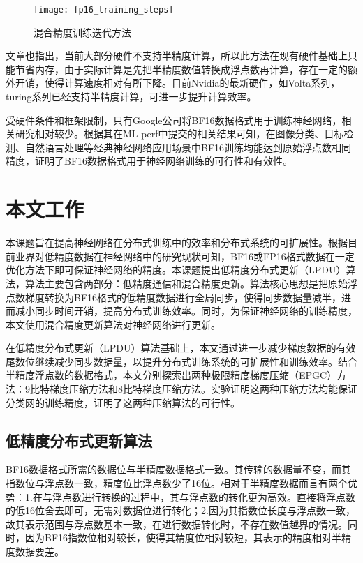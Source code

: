 \begin{figure}[htp]
\centering
\texttt{[image: fp16\_training\_steps]}
\caption{混合精度训练迭代方法}
\label{fig:fp16_training_steps}
\end{figure}
文章也指出，当前大部分硬件不支持半精度计算，所以此方法在现有硬件基础上只能节省内存，由于实际计算是先把半精度数值转换成浮点数再计算，存在一定的额外开销，使得计算速度相对有所下降。目前Nvidia的最新硬件，如Volta系列，turing系列已经支持半精度计算，可进一步提升计算效率。

受硬件条件和框架限制，只有Google公司将BF16数据格式用于训练神经网络，相关研究相对较少。根据其在ML perf中提交的相关结果可知，在图像分类、目标检测、自然语言处理等经典神经网络应用场景中BF16训练均能达到原始浮点数相同精度，证明了BF16数据格式用于神经网络训练的可行性和有效性。

\section{本文工作}
本课题旨在提高神经网络在分布式训练中的效率和分布式系统的可扩展性。根据目前业界对低精度数据在神经网络中的研究现状可知，BF16或FP16格式数据在一定优化方法下即可保证神经网络的精度。本课题提出低精度分布式更新（LPDU）算法，算法主要包含两部分：低精度通信和混合精度更新。算法核心思想是把原始浮点数梯度转换为BF16格式的低精度数据进行全局同步，使得同步数据量减半，进而减小同步时间开销，提高分布式训练效率。同时，为保证神经网络的训练精度，本文使用混合精度更新算法对神经网络进行更新。

在低精度分布式更新（LPDU）算法基础上，本文通过进一步减少梯度数据的有效尾数位继续减少同步数据量，以提升分布式训练系统的可扩展性和训练效率。结合半精度浮点数的数据格式，本文分别探索出两种极限精度梯度压缩（EPGC）方法：9比特梯度压缩方法和8比特梯度压缩方法。实验证明这两种压缩方法均能保证分类网的训练精度，证明了这两种压缩算法的可行性。

\subsection{低精度分布式更新算法}
BF16数据格式所需的数据位与半精度数据格式一致。其传输的数据量不变，而其指数位与浮点数一致，精度位比浮点数少了16位。相对于半精度数据而言有两个优势：1.在与浮点数进行转换的过程中，其与浮点数的转化更为高效。直接将浮点数的低16位舍去即可，无需对数据位进行转化；2.因为其指数位长度与浮点数一致，故其表示范围与浮点数基本一致，在进行数据转化时，不存在数值越界的情况。同时，因为BF16指数位相对较长，使得其精度位相对较短，其表示的精度相对半精度数据要差。

